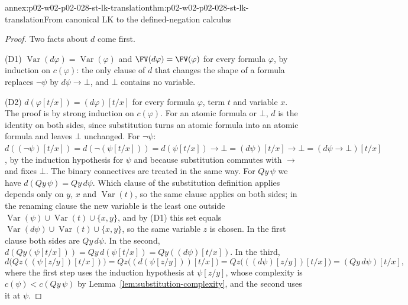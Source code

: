 \begin{annexitem}{annex:p02-w02-p02-028-st-lk-translation}{thm:p02-w02-p02-028-st-lk-translation}{From canonical LK to the defined-negation calculus}
\begin{proof}
Two facts about \(d\) come first.

(D1) \(\operatorname{Var}(d\varphi)=\operatorname{Var}(\varphi)\) and
\(\FV(d\varphi)=\FV(\varphi)\) for every formula \(\varphi\), by induction on
\(c(\varphi)\): the only clause of \(d\) that changes the shape of a formula
replaces \(\neg\psi\) by \(d\psi\to\bot\), and \(\bot\) contains no variable.

(D2) \(d(\varphi[t/x])=(d\varphi)[t/x]\) for every formula \(\varphi\), term
\(t\) and variable \(x\).  The proof is by strong induction on \(c(\varphi)\).
For an atomic formula or \(\bot\), \(d\) is the identity on both sides, since
substitution turns an atomic formula into an atomic formula and leaves
\(\bot\) unchanged.  For \(\neg\psi\):
\(d((\neg\psi)[t/x])=d(\neg(\psi[t/x]))=d(\psi[t/x])\to\bot
=(d\psi)[t/x]\to\bot=(d\psi\to\bot)[t/x]\), by the induction hypothesis for
\(\psi\) and because substitution commutes with \(\to\) and fixes \(\bot\).
The binary connectives are treated in the same way.  For \(Qy\,\psi\) we have
\(d(Qy\,\psi)=Qy\,d\psi\).  Which clause of the substitution definition
applies depends only on \(y\), \(x\) and \(\operatorname{Var}(t)\), so the
same clause applies on both sides; in the renaming clause the new variable is
the least one outside
\(\operatorname{Var}(\psi)\cup\operatorname{Var}(t)\cup\{x,y\}\), and by
(D1) this set equals
\(\operatorname{Var}(d\psi)\cup\operatorname{Var}(t)\cup\{x,y\}\), so the
same variable \(z\) is chosen.  In the first clause both sides are
\(Qy\,d\psi\).  In the second,
\(d(Qy(\psi[t/x]))=Qy\,d(\psi[t/x])=Qy((d\psi)[t/x])\).  In the third,
\[
 d\bigl(Qz((\psi[z/y])[t/x])\bigr)
 =Qz\bigl((d(\psi[z/y]))[t/x]\bigr)
 =Qz\bigl(((d\psi)[z/y])[t/x]\bigr)
 =(Qy\,d\psi)[t/x],
\]
where the first step uses the induction hypothesis at \(\psi[z/y]\), whose
complexity is \(c(\psi)<c(Qy\,\psi)\) by
Lemma~\ref{lem:substitution-complexity}, and the second uses it at \(\psi\).


\end{proof}
\end{annexitem}
